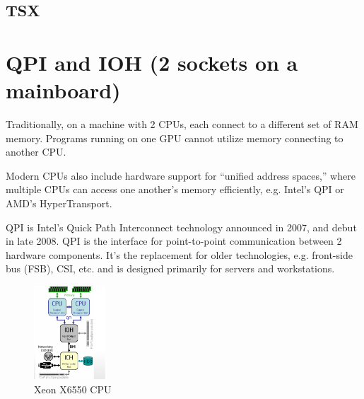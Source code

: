     
\subsection{TSX}


\section{QPI and IOH (2 sockets on a mainboard)}
\label{sec:QPI_IOH}

Traditionally, on a machine with 2 CPUs, each connect to a different set of RAM memory.
Programs running on one GPU cannot utilize memory connecting to another CPU.

Modern CPUs also include hardware support for “unified address spaces,” where
multiple CPUs can access one another’s memory efficiently, e.g. Intel's QPI or
AMD's HyperTransport.


QPI is Intel's Quick Path Interconnect technology announced in 2007, and debut
in late 2008. QPI is the interface for point-to-point communication between 2
hardware components. It's the replacement for older technologies, e.g. front-side bus
(FSB), CSI, etc. and is designed primarily for servers and workstations.

\begin{figure}[hbt]
  \centerline{\includegraphics[height=3.5cm,
    angle=0]{./images/QPI_DMI.eps}}
  \caption{Xeon X6550 CPU}
  \label{fig:QPI_DMI}
\end{figure}

